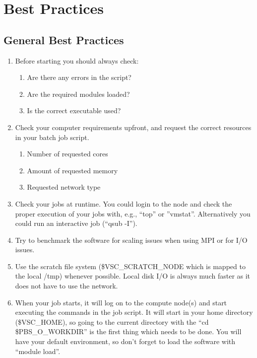 \chapter{Best Practices}
\label{ch:best-practices}

\section{General Best Practices}
\label{sec:general-best-practices}
\begin{enumerate}

  \item  Before starting you should always check:
  \begin{enumerate}
    \item  Are there any errors in the script?
    \item  Are the required modules loaded?
    \item  Is the correct executable used?
  \end{enumerate}

  \item  Check your computer requirements upfront, and request the correct resources in your batch job script.
  \begin{enumerate}
    \item  Number of requested cores
    \item  Amount of requested memory
    \item  Requested network type
  \end{enumerate}

  \item  Check your jobs at runtime. You could login to the node and check the
    proper execution of your jobs with, e.g., ``top'' or ''vmstat''.
    Alternatively you could run an interactive job (``qsub -I'').

  \item  Try to benchmark the software for scaling issues when using MPI or for
    I/O issues.

  \item  Use the scratch file system (\$VSC\_SCRATCH\_NODE which is mapped to the
    local /tmp) whenever possible. Local disk I/O is always much faster as it
    does not have to use the network.

  \item  When your job starts, it will log on to the compute node(s) and start
    executing the commands in the job script. It will start in your home
    directory (\$VSC\_HOME), so going to the current directory with the ``cd
    \$PBS\_O\_WORKDIR'' is the first thing which needs to be done.  You will
    have your default environment, so don't forget to load the software with
    ``module load''.


\end{enumerate}

